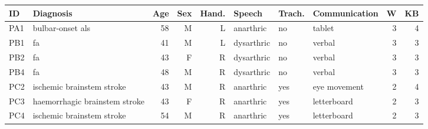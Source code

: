 \footnotesize
\begin{tabularx}{\linewidth}{@{}Xlrrrlllrr@{}}
	\toprule
	\textbf{ID}     & \textbf{Diagnosis}            & \textbf{Age}           & \textbf{Sex} & \textbf{Hand.} &
	\textbf{Speech} & \textbf{Trach.}               & \textbf{Communication} &
	\textbf{W}      & \textbf{KB}                                                                                                                      \\ \midrule
	PA1             & bulbar-onset \acs{als}        & 58                     & M            & L              & anarthric  & no  & tablet       & 3 & 4 \\
	PB1             & \acs{fa}                      & 41                     & M            & L              & dysarthric & no  & verbal       & 3 & 3 \\
	PB2             & \acs{fa}                      & 43                     & F            & R              & dysarthric & no  & verbal       & 3 & 3 \\
	PB4             & \acs{fa}                      & 48                     & M            & R              & dysarthric & no  & verbal       & 3 & 3 \\
	PC2             & ischemic brainstem stroke     & 43                     & M            & R              & anarthric  & yes & eye movement & 2 & 4 \\
	PC3             & haemorrhagic brainstem stroke & 43                     & F            & R              & anarthric  & yes & letterboard  & 2 & 3 \\
	PC4             & ischemic brainstem stroke     & 54                     & M            & R              & anarthric  & yes & letterboard  & 2 & 3 \\
	\bottomrule
\end{tabularx}
